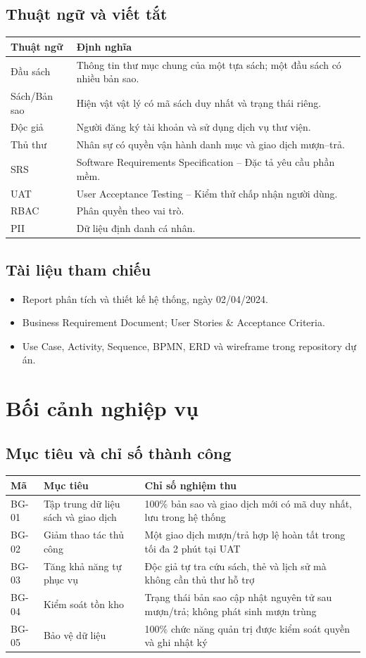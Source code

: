 \documentclass[12pt,a4paper,oneside]{report}
\begin{document}
\section{Thuật ngữ và viết tắt}
\begin{longtable}{L{3.2cm}L{11.5cm}}
\toprule Thuật ngữ & Định nghĩa\\\midrule\endhead
Đầu sách & Thông tin thư mục chung của một tựa sách; một đầu sách có nhiều bản sao.\\
Sách/Bản sao & Hiện vật vật lý có mã sách duy nhất và trạng thái riêng.\\
Độc giả & Người đăng ký tài khoản và sử dụng dịch vụ thư viện.\\
Thủ thư & Nhân sự có quyền vận hành danh mục và giao dịch mượn--trả.\\
SRS & Software Requirements Specification -- Đặc tả yêu cầu phần mềm.\\
UAT & User Acceptance Testing -- Kiểm thử chấp nhận người dùng.\\
RBAC & Phân quyền theo vai trò.\\
PII & Dữ liệu định danh cá nhân.\\
\bottomrule
\end{longtable}

\section{Tài liệu tham chiếu}
\begin{itemize}
\item Report phân tích và thiết kế hệ thống, ngày 02/04/2024.
\item Business Requirement Document; User Stories \& Acceptance Criteria.
\item Use Case, Activity, Sequence, BPMN, ERD và wireframe trong repository dự án.
\end{itemize}

\chapter{Bối cảnh nghiệp vụ}
\section{Mục tiêu và chỉ số thành công}
\begin{longtable}{L{2cm}L{7.2cm}L{5.4cm}}
\toprule Mã & Mục tiêu & Chỉ số nghiệm thu\\\midrule\endhead
BG-01 & Tập trung dữ liệu sách và giao dịch & 100\% bản sao và giao dịch mới có mã duy nhất, lưu trong hệ thống\\
BG-02 & Giảm thao tác thủ công & Một giao dịch mượn/trả hợp lệ hoàn tất trong tối đa 2 phút tại UAT\\
BG-03 & Tăng khả năng tự phục vụ & Độc giả tự tra cứu sách, thẻ và lịch sử mà không cần thủ thư hỗ trợ\\
BG-04 & Kiểm soát tồn kho & Trạng thái bản sao cập nhật nguyên tử sau mượn/trả; không phát sinh mượn trùng\\
BG-05 & Bảo vệ dữ liệu & 100\% chức năng quản trị được kiểm soát quyền và ghi nhật ký\\
\bottomrule
\end{longtable}
\end{document}
